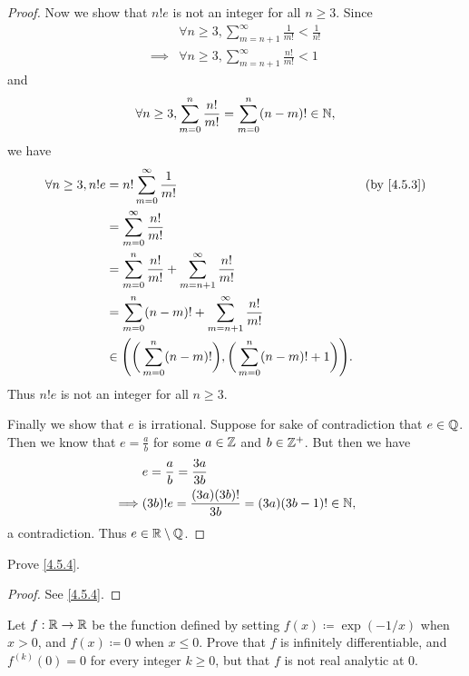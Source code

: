 \begin{proof}
  Now we show that \(n! e\) is not an integer for all \(n \geq 3\).
  Since
  \begin{align*}
             & \forall n \geq 3, \sum_{m = n + 1}^\infty \frac{1}{m!} < \frac{1}{n!} \\
    \implies & \forall n \geq 3, \sum_{m = n + 1}^\infty \frac{n!}{m!} < 1
  \end{align*}
  and
  \[
    \forall n \geq 3, \sum_{m = 0}^n \frac{n!}{m!} = \sum_{m = 0}^n (n - m)! \in \mathbb{N},
  \]
  we have
  \begin{align*}
    \forall n \geq 3, n! e & = n! \sum_{m = 0}^\infty \frac{1}{m!}                                                         & \text{(by \cref{4.5.3})} \\
                           & = \sum_{m = 0}^\infty \frac{n!}{m!}                                                                                      \\
                           & = \sum_{m = 0}^n \frac{n!}{m!} + \sum_{m = n + 1}^\infty \frac{n!}{m!}                                                   \\
                           & = \sum_{m = 0}^n (n - m)! + \sum_{m = n + 1}^\infty \frac{n!}{m!}                                                        \\
                           & \in \Bigg(\bigg(\sum_{m = 0}^n (n - m)!\bigg), \bigg(\sum_{m = 0}^n (n - m)! + 1\bigg)\Bigg).
  \end{align*}
  Thus \(n! e\) is not an integer for all \(n \geq 3\).

  Finally we show that \(e\) is irrational.
  Suppose for sake of contradiction that \(e \in \mathbb{Q}\).
  Then we know that \(e = \frac{a}{b}\) for some \(a \in \mathbb{Z}\) and \(b \in \mathbb{Z}^+\).
  But then we have
  \begin{align*}
             & e = \frac{a}{b} = \frac{3a}{3b}                          \\
    \implies & (3b)! e = \frac{(3a) (3b)!}{3b} = (3a) (3b - 1)! \in \mathbb{N},
  \end{align*}
  a contradiction.
  Thus \(e \in \mathbb{R} \setminus \mathbb{Q}\).
\end{proof}

\begin{ex}\label{ex:4.5.3}
  Prove \cref{4.5.4}.
\end{ex}

\begin{proof}
  See \cref{4.5.4}.
\end{proof}

\begin{ex}\label{ex:4.5.4}
  Let \(f : \mathbb{R} \to \mathbb{R}\) be the function defined by setting \(f(x) \coloneqq \exp(-1 / x)\) when \(x > 0\), and \(f(x) \coloneqq 0\) when \(x \leq 0\).
  Prove that \(f\) is infinitely differentiable, and \(f^{(k)}(0) = 0\) for every integer \(k \geq 0\), but that \(f\) is not real analytic at \(0\).
\end{ex}


